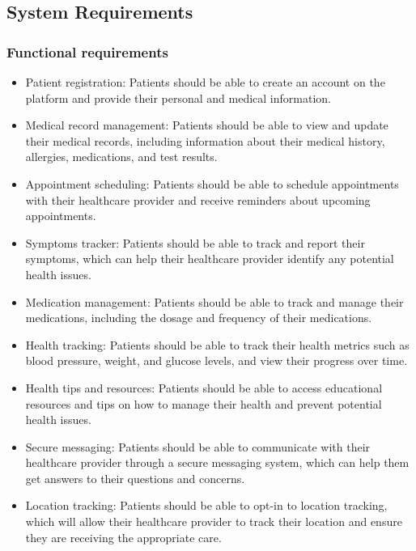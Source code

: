 \documentclass[12pt]{article}
\begin{document}
		\subsection{System Requirements}
			\subsubsection{Functional requirements}
				\begin{itemize}
					\item Patient registration: Patients should be able to create an account on the platform and provide their personal and medical information.
					\item Medical record management: Patients should be able to view and update their medical records, including information about their medical history, allergies, medications, and test results.
					\item Appointment scheduling: Patients should be able to schedule appointments with their healthcare provider and receive reminders about upcoming appointments.
					\item Symptoms tracker: Patients should be able to track and report their symptoms, which can help their healthcare provider identify any potential health issues.
					\item Medication management: Patients should be able to track and manage their medications, including the dosage and frequency of their medications.
					\item Health tracking: Patients should be able to track their health metrics such as blood pressure, weight, and glucose levels, and view their progress over time.
					\item Health tips and resources: Patients should be able to access educational resources and tips on how to manage their health and prevent potential health issues.
					\item Secure messaging: Patients should be able to communicate with their healthcare provider through a secure messaging system, which can help them get answers to their questions and concerns.
					\item Location tracking: Patients should be able to opt-in to location tracking, which will allow their healthcare provider to track their location and ensure they are receiving the appropriate care.
				\end{itemize}
\end{document}
